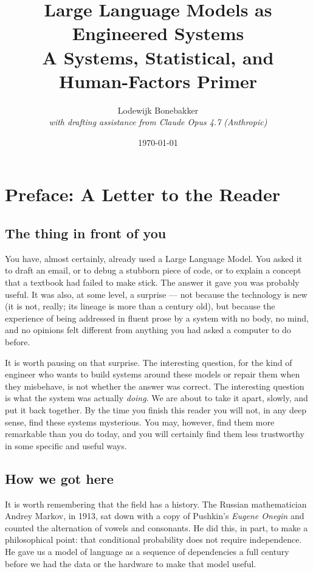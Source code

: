 \documentclass[11pt,a4paper,openany]{book}
\title{Large Language Models as Engineered Systems \\
       \large A Systems, Statistical, and Human-Factors Primer}
\author{Lodewijk Bonebakker \\[0.4em]
        \small\textit{with drafting assistance from Claude Opus 4.7 (Anthropic)}}
\date{\today}
\begin{document}
\frontmatter

\maketitle
\tableofcontents


\chapter*{Preface: A Letter to the Reader}

\section*{The thing in front of you}

You have, almost certainly, already used a Large Language Model. You
asked it to draft an email, or to debug a stubborn piece of code, or
to explain a concept that a textbook had failed to make stick. The
answer it gave you was probably useful. It was also, at some level,
a surprise --- not because the technology is new (it is not, really;
its lineage is more than a century old), but because the experience
of being addressed in fluent prose by a system with no body, no
mind, and no opinions felt different from anything you had asked a
computer to do before.

It is worth pausing on that surprise. The interesting question, for
the kind of engineer who wants to build systems around these models
or repair them when they misbehave, is not whether the answer was
correct. The interesting question is what the system was actually
\emph{doing}. We are about to take it apart, slowly, and put it back
together. By the time you finish this reader you will not, in any
deep sense, find these systems mysterious. You may, however, find
them more remarkable than you do today, and you will certainly find
them less trustworthy in some specific and useful ways.

\section*{How we got here}

It is worth remembering that the field has a history. The Russian
mathematician Andrey Markov, in 1913, sat down with a copy of
Pushkin's \emph{Eugene Onegin} and counted the alternation of vowels
and consonants. He did this, in part, to make a philosophical point:
that conditional probability does not require independence. He gave
us a model of language as a sequence of dependencies a full century
before we had the data or the hardware to make that model useful.
\end{document}
